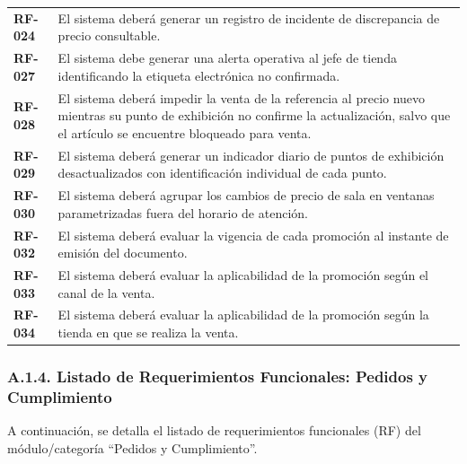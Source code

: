 \documentclass[11pt]{article}
\begin{document}
\begin{longtable}[]{@{}
  >{\raggedright\arraybackslash}p{}
  >{\raggedright\arraybackslash}p{}@{}}
\addlinespace[2pt]
\textbf{RF-024} & El sistema deberá generar un registro de incidente de discrepancia de precio consultable. \\
\addlinespace[2pt]
\textbf{RF-027} & El sistema debe generar una alerta operativa al jefe de tienda identificando la etiqueta electrónica no confirmada. \\
\addlinespace[2pt]
\textbf{RF-028} & El sistema deberá impedir la venta de la referencia al precio nuevo mientras su punto de exhibición no confirme la actualización, salvo que el artículo se encuentre bloqueado para venta. \\
\addlinespace[2pt]
\textbf{RF-029} & El sistema deberá generar un indicador diario de puntos de exhibición desactualizados con identificación individual de cada punto. \\
\addlinespace[2pt]
\textbf{RF-030} & El sistema deberá agrupar los cambios de precio de sala en ventanas parametrizadas fuera del horario de atención. \\
\addlinespace[2pt]
\textbf{RF-032} & El sistema deberá evaluar la vigencia de cada promoción al instante de emisión del documento. \\
\addlinespace[2pt]
\textbf{RF-033} & El sistema deberá evaluar la aplicabilidad de la promoción según el canal de la venta. \\
\addlinespace[2pt]
\textbf{RF-034} & El sistema deberá evaluar la aplicabilidad de la promoción según la tienda en que se realiza la venta. \\
\end{longtable}

\subsubsection{A.1.4. Listado de Requerimientos Funcionales: Pedidos y Cumplimiento}\label{a-1-4-listado-de-requerimientos-funcionales-pedidos-y-cumplimiento}

A continuación, se detalla el listado de requerimientos funcionales (RF) del módulo/categoría ``Pedidos y Cumplimiento''.
\end{document}
